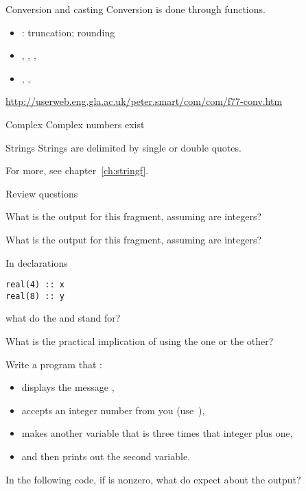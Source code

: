 \begin{block}{Conversion and casting}
  Conversion is done through functions.
  \begin{itemize}
  \item {}: truncation;  rounding
  \item {}, , , 
  \item {}, , 
  \end{itemize}
\url{http://userweb.eng.gla.ac.uk/peter.smart/com/com/f77-conv.htm}
\end{block}

\begin{block}{Complex}
  Complex numbers exist
\end{block}

\begin{block}{Strings}
  Strings are delimited by single or double quotes.

  For more, see chapter~\ref{ch:stringf}.
\end{block}

 {Review questions}

\begin{exercise}
  What is the output for this fragment, assuming  are integers?
\end{exercise}

\begin{exercise}
  What is the output for this fragment, assuming  are integers?
\end{exercise}

\begin{exercise}
  \label{ex:f-elt-rev1}
  In declarations
\begin{lstlisting}
real(4) :: x
real(8) :: y
\end{lstlisting}
what do the  and  stand for?

What is the practical implication of using the one or the other?
\end{exercise}

\begin{exercise}
  \label{ex:read-writet3np1}
  Write a program that :
  \begin{itemize}
  \item displays the message ,
  \item accepts an integer number from you (use~),
  \item makes another variable that is three times that integer plus one,
  \item and then prints out the second variable.
  \end{itemize}
\end{exercise}

\begin{exercise}
  \label{ex:f-elt-rev2}
  In the following code, if  is nonzero, what do expect about
  the output?
\end{exercise}
